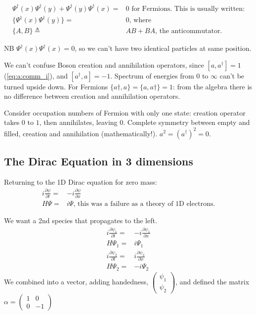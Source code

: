 \documentclass[]{article}
\begin{document}
\begin{align*}
	\Psi^\dagger(x)\Psi^\dagger(y)+\Psi^\dagger(y)\Psi^\dagger(x)=&0 \text{ for Fermions. This is usually written:}\\
	\{\Psi^\dagger(x)\Psi^\dagger(y)\}=&0 \text{, where}\\
	\{A,B\}\triangleq& AB + BA \text{, the anticommutator.}
\end{align*}

NB  $\Psi^\dagger(x)\Psi^\dagger(x)=0$,  so we can't have two identical particles at same position.

We can't confuse Boson creation and annihilation operators, since $[a,a^\dagger]=1$ (\ref{eq:a:comm_i}), and $[a^\dagger,a]=-1$. Spectrum of energies from $0$ to $\infty$ can't be turned upside down. For Fermions $\{a\dagger,a\}= \{a,a\dagger\}=1$: from the algebra there is no difference between creation and annihilation operators.

Consider occupation numbers of Fermion with only one state: creation operator takes $0$ to $1$, then annihilates, leaving 0. Complete symmetry between empty and filled, creation and annihilation (mathematically!). $a^2=(a^\dagger)^2=0$.

\subsection{The Dirac Equation in 3 dimensions}

Returning to the 1D Dirac equation for zero mass:
\begin{align*}
i \frac{\partial \psi}{\partial t}=& -i \frac{\partial \psi}{\partial x} \\
H \Psi =& i \Psi \text{, this was a failure as a theory of 1D electrons.}
\end{align*}

We want a 2nd species that propagates to the left.
\begin{align*}
i \frac{\partial \psi_1}{\partial t}=& -i \frac{\partial \psi_1}{\partial x} \\
H \Psi_1 =& i \Psi_1\\
i \frac{\partial \psi_2}{\partial t}=& i \frac{\partial \psi_2}{\partial x} \\
H \Psi_2 =& -i \Psi_2
\end{align*}
We combined into a vector, adding handedness, $\begin{pmatrix} \psi_1\\ \psi_2 \end{pmatrix}$, and defined the matrix $\alpha = \begin{pmatrix}
1&0\\
0&-1
\end{pmatrix}$
\end{document}
